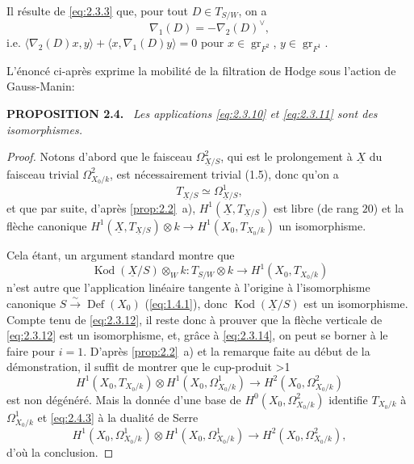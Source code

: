 \documentclass[10pt]{article}
\makeatletter
\DeclareMathOperator{\Def}{Def}
\DeclareMathOperator{\gr}{gr}
\DeclareMathOperator{\Kod}{Kod}
\newcommand{\UX}{\underline{X}}
\newcommand{\sourceanchor}[2]{\begingroup\def\@currentlabel{#2}\label{#1}\endgroup}
\newenvironment{sourcestatement}[3]{\par\smallskip\noindent\textbf{#1 #2.}\sourceanchor{#3}{#2}\ \itshape}{\par\normalfont\smallskip}
\newcommand{\DPage}[2]{\ifnum#1>1\clearpage\fi\setcounter{page}{#2}}
\makeatother
\begin{document}
Il résulte de \eqref{eq:2.3.3} que, pour tout $D \in T_{S/W}$, on a
\begin{equation}\tag{2.3.14}\label{eq:2.3.14}
\nabla_1(D) = -\nabla_2(D)^{\vee},
\end{equation}
i.e. $\langle \nabla_2(D)x, y \rangle + \langle x, \nabla_1(D)y \rangle = 0$ pour $x \in \gr_{F^2}$, $y \in \gr_{F^1}$.

L'énoncé ci-après exprime la mobilité de la filtration de Hodge sous l'action de Gauss-Manin:

\begin{sourcestatement}{PROPOSITION}{2.4}{prop:2.4}
Les applications \eqref{eq:2.3.10} et \eqref{eq:2.3.11} sont des isomorphismes.
\end{sourcestatement}

\begin{proof}
Notons d'abord que le faisceau $\Omega^2_{\UX/S}$, qui est le prolongement à $\UX$ du faisceau trivial $\Omega^2_{X_0/k}$, est nécessairement trivial (1.5), donc qu'on a
\begin{equation}\tag{2.4.1}\label{eq:2.4.1}
T_{\UX/S} \simeq \Omega^1_{\UX/S},
\end{equation}
et que par suite, d'après \ref{prop:2.2}~a), $H^1(\UX, T_{\UX/S})$ est libre (de rang $20$) et la flèche canonique $H^1(\UX, T_{\UX/S}) \otimes k \to H^1(X_0, T_{X_0/k})$ un isomorphisme.

Cela étant, un argument standard montre que
\begin{equation}\tag{2.4.2}\label{eq:2.4.2}
\Kod(\UX/S) \otimes_W k: T_{S/W} \otimes k \to H^1(X_0, T_{X_0/k})
\end{equation}
n'est autre que l'application linéaire tangente à l'origine à l'isomorphisme canonique $S \xrightarrow{\sim} \Def(X_0)$ (\eqref{eq:1.4.1}), donc $\Kod(\UX/S)$ est un isomorphisme. Compte tenu de \eqref{eq:2.3.12}, il reste donc à prouver que la flèche verticale de \eqref{eq:2.3.12} est un isomorphisme, et, grâce à \eqref{eq:2.3.14}, on peut se borner à le faire pour $i = 1$. D'après \ref{prop:2.2}~a) et la remarque faite au début de la démonstration, il suffit de montrer que le cup-produit
\DPage{12}{69}
\begin{equation}\tag{2.4.3}\label{eq:2.4.3}
H^1(X_0, T_{X_0/k}) \otimes H^1(X_0, \Omega^1_{X_0/k}) \to H^2(X_0, \Omega^2_{X_0/k})
\end{equation}
est non dégénéré. Mais la donnée d'une base de $H^0(X_0, \Omega^2_{X_0/k})$ identifie $T_{X_0/k}$ à $\Omega^1_{X_0/k}$ et \eqref{eq:2.4.3} à la dualité de Serre
\[
H^1(X_0, \Omega^1_{X_0/k}) \otimes H^1(X_0, \Omega^1_{X_0/k}) \to H^2(X_0, \Omega^2_{X_0/k}),
\]
d'où la conclusion.
\end{proof}
\end{document}
